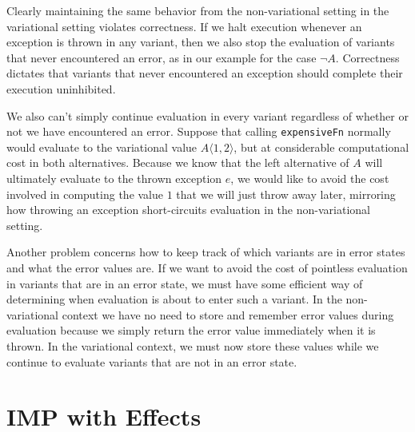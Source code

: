 \documentclass[letterpaper,10pt,onecolumn]{article}
\newcommand{\tagtree}[3]{#1 \langle #2, #3 \rangle}
\begin{document}
Clearly maintaining the same behavior from the non-variational setting in the variational setting
violates correctness. If we halt execution whenever an exception is
thrown in any variant, then we also stop the evaluation of variants that never encountered an error,
as in our example for the case $\neg A$. Correctness dictates that variants that never encountered
an exception should complete their execution uninhibited.

We also can't simply continue evaluation
in every variant regardless of whether or not we have encountered an error.
Suppose that calling \texttt{expensiveFn} normally would evaluate to the variational value $\tagtree{A}{1}{2}$, but at considerable computational cost in both alternatives.
Because we know that the left alternative of $A$ will ultimately evaluate to the thrown exception $e$, we would
like to avoid the cost involved in computing the value $1$ that we will just throw away later, mirroring how throwing an exception short-circuits evaluation in the
non-variational setting. 

Another problem concerns how to keep track of which variants are in error states and what
the error values are. If we want to avoid the cost of pointless evaluation in variants that are in an error
state, we must have some efficient way of determining when evaluation is about to enter such a variant.
In the non-variational context we have no need to store and remember error values during evaluation
because we simply return the error value immediately when it is thrown. In the variational context, we
must now store these values while we continue to evaluate variants that are not in an error state.

\section{IMP with Effects}

\end{document}
